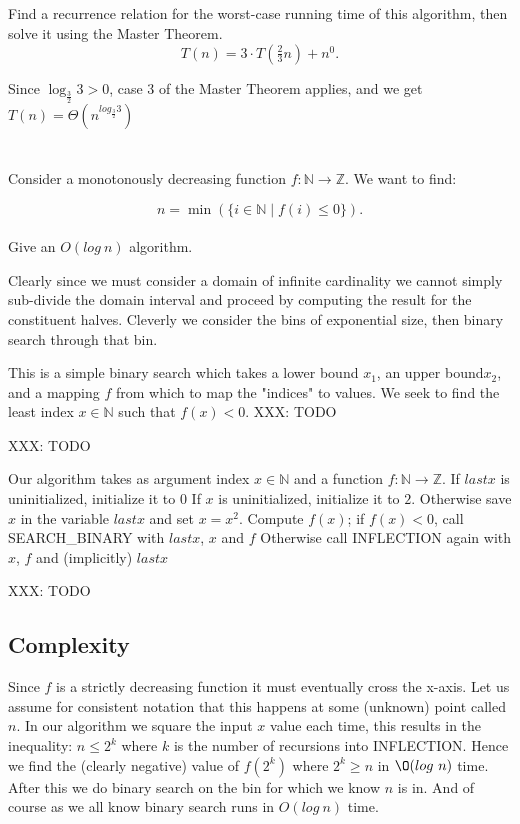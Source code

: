 \documentclass{amsart}
\theoremstyle{definition}
\theoremstyle{remark}
\numberwithin{equation}{section}
\newcommand{\NN}{\mathbb N}
\newcommand{\ZZ}{\mathbb Z}
\begin{document}
\subsection{} Find a recurrence relation for the worst-case running time of this algorithm, then solve it using the Master Theorem.
$$ T(n) = 3 \cdot T( \tfrac{2}{3} n) + n^0. $$

Since $\log_{\frac{3}{2}} {3} > 0$, case 3 of the Master Theorem applies, and we get
$T(n) = \Theta ( n^{log_{\frac{3}{2}} {3}} )$


\section{} Consider a monotonously decreasing function $f : \NN \rightarrow \ZZ$. We want to find:

$$ n = \min (\{i \in \NN \mid f(i) \leq 0 \}).$$ \\ 

Give an $O(log\ n)$ algorithm.

Clearly since we must consider a domain of infinite cardinality we cannot simply sub-divide the domain interval and proceed by computing the result for the constituent halves. Cleverly we consider the bins of exponential size, then binary search through that bin.


This is a simple binary search which takes a lower bound $x_1$, an upper bound$x_2$,
and a mapping $f$ from which to map the "indices" to values. We seek to find
the least index $x \in \NN$ such that $f(x) < 0$.
XXX: TODO

\proof
XXX: TODO


Our algorithm takes as argument index $x \in \NN$ and a function $f :
\NN \rightarrow \ZZ$. If $lastx$ is uninitialized, initialize it to $0$
If $x$ is uninitialized, initialize it to $2$. Otherwise save $x$ in the
variable $lastx$ and set $x = x^2$. Compute $f(x)$; if $f(x) < 0$, call
SEARCH\_BINARY with $lastx$, $x$ and $f$ Otherwise call INFLECTION again with
$x$, $f$ and (implicitly) $lastx$

\proof
XXX: TODO


\subsection{Complexity}

Since $f$ is a strictly decreasing function it must eventually cross the
x-axis. Let us assume for consistent notation that this happens at some
(unknown) point called $n$. In our algorithm we square the input $x$
value each time, this results in the inequality: $n \leq 2^k$ where $k$
is the number of recursions into INFLECTION. Hence we find the (clearly
negative) value of $f(2^k)$ where $2^k \geq n$ in $\O(log\ n)$ time. After this
we do binary search on the bin for which we know $n$ is in. And of course
as we all know binary search runs in $O( log\ n )$ time.
\end{document}
